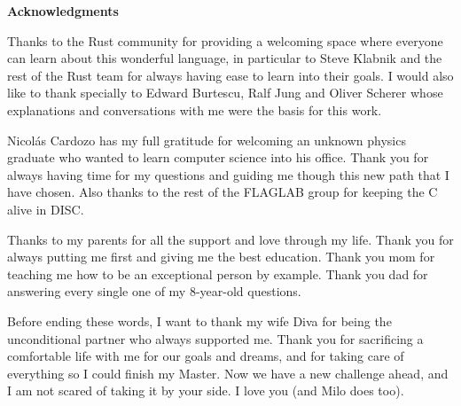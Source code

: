 \clearemptydoublepage
{}
{}

\vspace*{2cm}

\begin{center}
{\Large \textbf{Acknowledgments}}
\end{center}

\vspace{1cm}

Thanks to the Rust community for providing a welcoming space where everyone can
learn about this wonderful language, in particular to Steve Klabnik and the rest
of the Rust team for always having ease to learn into their goals. I would also
like to thank specially to Edward Burtescu, Ralf Jung and Oliver Scherer whose
explanations and conversations with me were the basis for this work.

Nicolás Cardozo has my full gratitude for welcoming an unknown physics graduate
who wanted to learn computer science into his office. Thank you for always
having time for my questions and guiding me though this new path that I have
chosen. Also thanks to the rest of the FLAGLAB group for keeping the C alive in
DISC.

Thanks to my parents for all the support and love through my life. Thank you
for always putting me first and giving me the best education. Thank you mom for
teaching me how to be an exceptional person by example. Thank you dad for
answering every single one of my 8-year-old questions.

Before ending these words, I want to thank my wife Diva for being the
unconditional partner who always supported me. Thank you for sacrificing a
comfortable life with me for our goals and dreams, and for taking care of
everything so I could finish my Master. Now we have a new challenge ahead, and
I am not scared of taking it by your side. I love you (and Milo does too).
